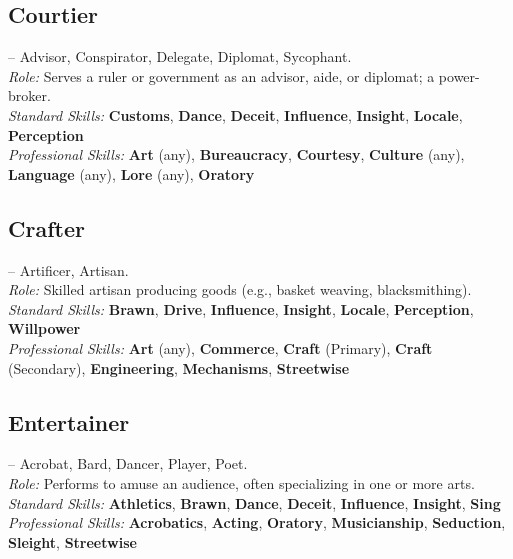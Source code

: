 \documentclass[10pt]{article}
\newcommand{\skill}[1]{\textbf{#1}}
\begin{document}
\vspace{0.2cm}
\subsection*{Courtier}
\label{career:courtier}
 -- Advisor, Conspirator, Delegate, Diplomat, Sycophant.\\
\textit{Role:} Serves a ruler or government as an advisor, aide, or diplomat; a power-broker.\\
\textit{Standard Skills:} \skill{Customs}, \skill{Dance}, \skill{Deceit}, \skill{Influence}, \skill{Insight}, \skill{Locale}, \skill{Perception}\\
\textit{Professional Skills:} \skill{Art} (any), \skill{Bureaucracy}, \skill{Courtesy}, \skill{Culture} (any), \skill{Language} (any), \skill{Lore} (any), \skill{Oratory}

\vspace{0.2cm}
\subsection*{Crafter}
\label{career:crafter}
 -- Artificer, Artisan.\\
\textit{Role:} Skilled artisan producing goods (e.g., basket weaving, blacksmithing).\\
\textit{Standard Skills:} \skill{Brawn}, \skill{Drive}, \skill{Influence}, \skill{Insight}, \skill{Locale}, \skill{Perception}, \skill{Willpower}\\
\textit{Professional Skills:} \skill{Art} (any), \skill{Commerce}, \skill{Craft} (Primary), \skill{Craft} (Secondary), \skill{Engineering}, \skill{Mechanisms}, \skill{Streetwise}

\vspace{0.2cm}
\subsection*{Entertainer}
\label{career:entertainer}
 -- Acrobat, Bard, Dancer, Player, Poet.\\
\textit{Role:} Performs to amuse an audience, often specializing in one or more arts.\\
\textit{Standard Skills:} \skill{Athletics}, \skill{Brawn}, \skill{Dance}, \skill{Deceit}, \skill{Influence}, \skill{Insight}, \skill{Sing}\\
\textit{Professional Skills:} \skill{Acrobatics}, \skill{Acting}, \skill{Oratory}, \skill{Musicianship}, \skill{Seduction}, \skill{Sleight}, \skill{Streetwise}
\end{document}
